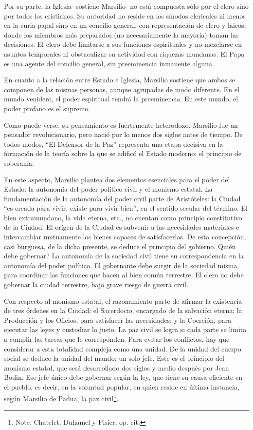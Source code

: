 \documentclass[
]{book}
\begin{document}
Por su parte, la Iglesia -sostiene Marsilio- no está compuesta sólo por el clero sino por todos los cristianos. Su autoridad no reside en los sínodos clericales ni menos en la curia papal sino en un concilio general, con representación de clero y laicos, donde los miembros más preparados (no necesariamente la mayoría) toman las decisiones. El clero debe limitarse a sus funciones espirituales y no mezclarse en asuntos temporales ni obstaculizar su actividad con riquezas mundanas. El Papa es una agente del concilio general, sin preeminencia inmanente alguna.

En cuanto a la relación entre Estado e Iglesia, Marsilio sostiene que ambos se componen de las mismas personas, aunque agrupadas de modo diferente. En el mundo venidero, el poder espiritual tendrá la preeminencia. En este mundo, el poder profano es el supremo.

Como puede verse, su pensamiento es fuertemente heterodoxo. Marsilio fue un pensador revolucionario, pero nació por lo menos dos siglos antes de tiempo. De todos modos, ``El Defensor de la Paz'' representa una etapa decisiva en la formación de la teoría sobre la que se edificó el Estado moderno: el principio de soberanía.

En este aspecto, Marsilio plantea dos elementos esenciales para el poder del Estado: la autonomía del poder político civil y el monismo estatal. La fundamentación de la autonomía del poder civil parte de Aristóteles: la Ciudad ``es creada para vivir, existe para vivir bien'', en el sentido secular del término. El bien extramundano, la vida eterna, etc., no cuentan como principio constitutivo de la Ciudad. El orígen de la Ciudad es subvenir a las necesidades materiales e intercambiar mutuamente los bienes capaces de satisfacerlas. De esta concepción, casi burguesa, de la dicha presente, se deduce el principio del gobierno. Quién debe gobernar? La autonomía de la sociedad civil tiene su correspondencia en la autonomía del poder político. El gobernante debe surgir de la sociedad misma, para coordinar las funciones que hacen al bien común terrestre. El clero no debe gobernar la ciudad terrestre, bajo grave riesgo de guerra civil.

Con respecto al monismo estatal, el razonamiento parte de afirmar la existencia de tres órdenes en la Ciudad: el Sacerdocio, encargado de la salvación eterna; la Producción y los Oficios, para satisfacer las necesidades; y la Coerción, para ejecutar las leyes y custodiar lo justo. La paz civil se logra si cada parte se limita a cumplir las tareas que le corresponden. Para evitar los conflictos, hay que considerar a esta totalidad compleja como una unidad. De la unidad del cuerpo social se deduce la unidad del mando: un solo jefe. Este es el principio del monismo estatal, que será desarrollado dos siglos y medio después por Jean Bodin. Ese jefe único debe gobernar según la ley, que tiene su causa eficiente en el pueblo, es decir, en la voluntad popular, en quien reside en última instancia, según Marsilio de Padua, la paz civil\footnote{Note: Chatelet, Duhamel y Pisier, op. cit.}.
\end{document}
